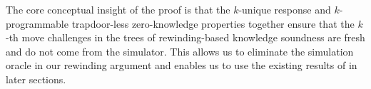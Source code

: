 The core conceptual insight of the proof is that the $k$-unique response  and $k$-programmable trapdoor-less zero-knowledge properties together ensure that the $k$-th move challenges in the trees of rewinding-based knowledge soundness are fresh and do not come from the simulator. This allows us to eliminate the simulation oracle in our rewinding argument and enables us to use the existing results of \cite{EPRINT:AttFehKlo21} in later sections.



%



